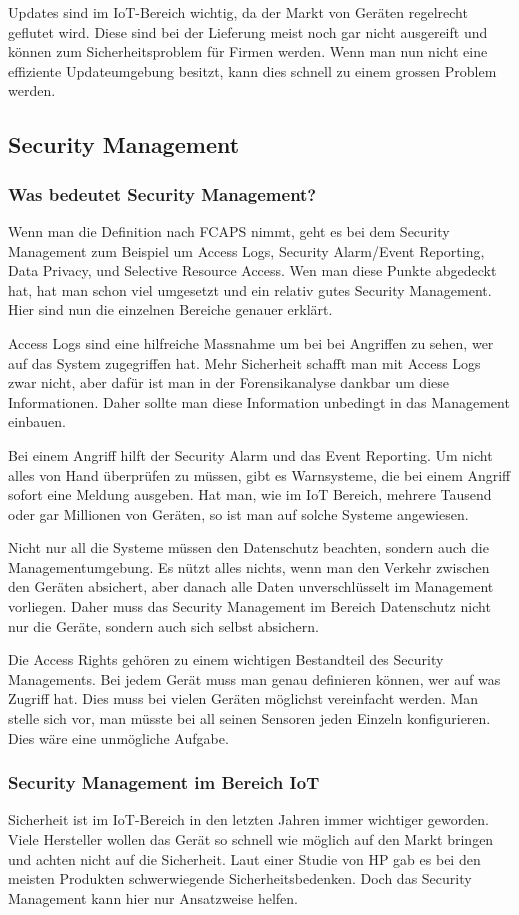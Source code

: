 Updates sind im IoT-Bereich wichtig, da der Markt von Geräten regelrecht geflutet wird. Diese sind bei der Lieferung meist noch gar nicht ausgereift und können zum Sicherheitsproblem für Firmen werden. Wenn man nun nicht eine effiziente Updateumgebung besitzt, kann dies schnell zu einem grossen Problem werden.
\subsection{Security Management}
\subsubsection{Was bedeutet Security Management?}
Wenn man die Definition nach FCAPS nimmt, geht es bei dem Security Management zum Beispiel um Access Logs, Security Alarm/Event Reporting, Data Privacy, und Selective Resource Access. Wen man diese Punkte abgedeckt hat, hat man schon viel umgesetzt und ein relativ gutes Security Management. Hier sind nun die einzelnen Bereiche genauer erklärt.

Access Logs sind eine hilfreiche Massnahme um bei bei Angriffen zu sehen, wer auf das System zugegriffen hat. Mehr Sicherheit schafft man mit Access Logs zwar nicht, aber dafür ist man in der Forensikanalyse dankbar um diese Informationen. Daher sollte man diese Information unbedingt in das Management einbauen. 

Bei einem Angriff hilft der Security Alarm und das Event Reporting. Um nicht alles von Hand überprüfen zu müssen, gibt es Warnsysteme, die bei einem Angriff sofort eine Meldung ausgeben. Hat man, wie im IoT Bereich, mehrere Tausend oder gar Millionen von Geräten, so ist man auf solche Systeme angewiesen.

Nicht nur all die Systeme müssen den Datenschutz beachten, sondern auch die Managementumgebung. Es nützt alles nichts, wenn man den Verkehr zwischen den Geräten absichert, aber danach alle Daten unverschlüsselt im Management vorliegen. Daher muss das Security Management im Bereich Datenschutz nicht nur die Geräte, sondern auch sich selbst absichern.

Die Access Rights gehören zu einem wichtigen Bestandteil des Security Managements. Bei jedem Gerät muss man genau definieren können, wer auf was Zugriff hat. Dies muss bei vielen Geräten möglichst vereinfacht werden. Man stelle sich vor, man müsste bei all seinen Sensoren jeden Einzeln konfigurieren. Dies wäre eine unmögliche Aufgabe.
\subsubsection{Security Management im Bereich IoT}
Sicherheit ist im IoT-Bereich in den letzten Jahren immer wichtiger geworden. Viele Hersteller wollen das Gerät so schnell wie möglich auf den Markt bringen und achten nicht auf die Sicherheit. Laut einer Studie von HP gab es bei den meisten Produkten schwerwiegende Sicherheitsbedenken.\cite{SecOverview} Doch das Security Management kann hier nur Ansatzweise helfen.

